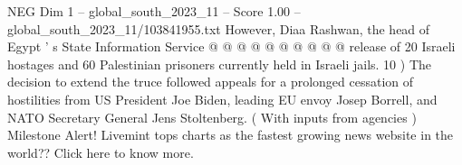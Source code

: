 \begin{textsample}{NEG Dim 1 – global\_south\_2023\_11 – Score 1.00 – global\_south\_2023\_11/103841955.txt}
However, Diaa Rashwan, the head of Egypt ' s State Information Service @ @ @ @ @ @ @ @ @ @ release of 20 Israeli hostages and 60 Palestinian prisoners currently held in Israeli jails. 10 ) The decision to extend the truce followed appeals for a prolonged cessation of hostilities from US President Joe Biden, leading EU envoy Josep Borrell, and NATO Secretary General Jens Stoltenberg. ( With inputs from agencies ) Milestone Alert!
Livemint tops charts as the fastest growing news website in the world??
Click here to know more.

\end{textsample}
